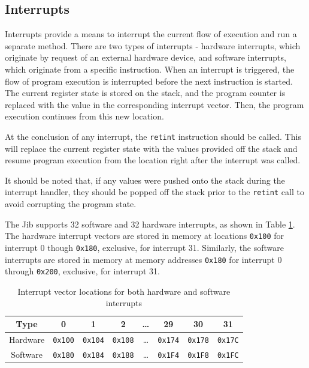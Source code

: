 \documentclass{article}
\begin{document}
\subsection{Interrupts}

Interrupts provide a means to interrupt the current flow of execution and run a separate method. There are two types of interrupts - hardware interrupts, which originate by request of an external hardware device, and software interrupts, which originate from a specific instruction. When an interrupt is triggered, the flow of program execution is interrupted before the next instruction is started. The current register state is stored on the stack, and the program counter is replaced with the value in the corresponding interrupt vector. Then, the program execution continues from this new location.

At the conclusion of any interrupt, the \texttt{retint} instruction should be called. This will replace the current register state with the values provided off the stack and resume program execution from the location right after the interrupt was called.

It should be noted that, if any values were pushed onto the stack during the interrupt handler, they should be popped off the stack prior to the \texttt{retint} call to avoid corrupting the program state.

The Jib supports 32 software and 32 hardware interrupts, as shown in Table \ref{table:interrupt-vector-locations}. The hardware interrupt vectors are stored in memory at locations \texttt{0x100} for interrupt 0 though \texttt{0x180}, exclusive, for interrupt 31. Similarly, the software interrupts are stored in memory at memory addresses \texttt{0x180} for interrupt 0 through \texttt{0x200}, exclusive, for interrupt 31.

\begin{table}[h!]
    \centering
    \begin{tabular}{c|ccccccc}
        \hline
        Type & 0 & 1 & 2 & \dots & 29 & 30 & 31 \\
        \hline
        Hardware & \texttt{0x100} & \texttt{0x104} & \texttt{0x108} & \dots & \texttt{0x174} & \texttt{0x178} & \texttt{0x17C} \\
        Software & \texttt{0x180} & \texttt{0x184} & \texttt{0x188} & \dots & \texttt{0x1F4} & \texttt{0x1F8} & \texttt{0x1FC} \\
        \hline
    \end{tabular}
    \caption{Interrupt vector locations for both hardware and software interrupts}
    \label{table:interrupt-vector-locations}
\end{table}
\end{document}
